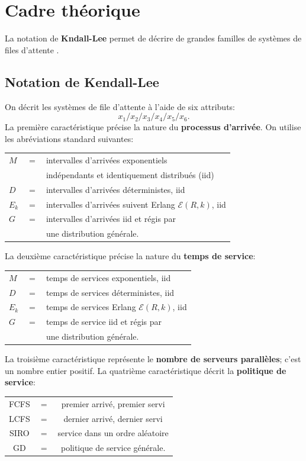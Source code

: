 
\section{Cadre théorique}
La notation de \textbf{Kndall-Lee} permet de décrire de grandes familles de systèmes de files d'attente \cite{QS_K}.
\subsection{Notation de Kendall-Lee}
On décrit les systèmes de file d'attente à l'aide de  six attributs: $$x_1/x_2/x_3/x_4/x_5/x_6.$$
La première caractéristique précise la nature du \textbf{processus d'arrivée}. On utilise les abréviations standard suivantes:
\newl \begin{tabular}{p{0.25cm}p{0.25cm}p{15cm}}
$M$ &$=$& intervalles d’arrivées exponentiels \\ & & \quad   indépendants et identiquement distribués (iid) \\
$D$ &$=$& intervalles d’arrivées déterministes, iid\\
$E_{k}$ &$=$& intervalles d’arrivées suivent Erlang $\mathcal{E}(R,k)$, iid  \\
$G$ &$=$& intervalles d’arrivées iid et régis par  \\ & & \quad une distribution générale.
\end{tabular}
\newl
La deuxième caractéristique précise la nature du \textbf{temps de service}:
\newline \newline
\begin{tabular}{p{0.25cm}p{}p{12cm}}
$M$ &$=$& temps de services exponentiels, iid \\
$D$ &$=$& temps de services déterministes, iid\\
$E_{k}$ &$=$& temps de services Erlang $\mathcal{E}(R,k)$, iid \\
$G$ &$=$& temps de service iid et régis par  \\ & & \quad une distribution générale.
\end{tabular}
\newpage\noindent
La troisième caractéristique représente le \textbf{nombre de ser\-veurs parallèles}; c'est un nombre entier positif. \newl  La quatrième caractéristique décrit la \textbf{politique de service}:
\newl
\begin{tabular}{ccc}
FCFS &$=$& premier arrivé, premier servi\\
LCFS &$=$& dernier arrivé, dernier servi\\
SIRO &$=$& service dans un ordre aléatoire\\
GD &$=$& politique de service générale.
\end{tabular}
